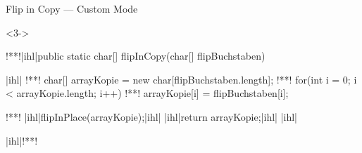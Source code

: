 \begin{frame}[fragile,c]{Flip in Copy --- Custom Mode}
\begin{center}
    \color{gray}
\end{center}
\SetupLstHl
\begin{uncoverenv}<3->
\begin{plainjava}
!**!|ihl|public static char[] flipInCopy(char[] flipBuchstaben) {|ihl|
!**!    char[] arrayKopie = new char[flipBuchstaben.length];
!**!    for(int i = 0; i < arrayKopie.length; i++)
!**!        arrayKopie[i] = flipBuchstaben[i];

!**!    |ihl|flipInPlace(arrayKopie);|ihl|
    |ihl|return arrayKopie;|ihl|
|ihl|}|ihl|!**!
\end{plainjava}
\end{uncoverenv}
\end{frame}

